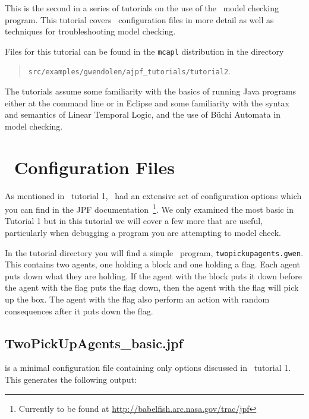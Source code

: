 
This is the second in a series of tutorials on the use of the \ajpf\ model checking program.  This tutorial covers \jpf\ configuration files in more detail as well as techniques for troubleshooting model checking.

Files for this tutorial can be found in the \texttt{mcapl} distribution in the directory 
\begin{quote}
\texttt{src/examples/gwendolen/ajpf\_tutorials/tutorial2}.
\end{quote}

The tutorials assume some familiarity with the basics of running Java programs either at the command line or in Eclipse and some familiarity with the syntax and semantics of Linear Temporal Logic, and the use of B\"{u}chi Automata in model checking.

\section{\jpf\ Configuration Files}
As mentioned in \ajpf\ tutorial 1, \jpf\ had an extensive set of configuration options which you can find in the JPF documentation~\footnote{Currently to be found at \url{http://babelfish.arc.nasa.gov/trac/jpf}}. We only examined the most basic in Tutorial 1 but in this tutorial we will cover a few more that are useful, particularly when debugging a program you are attempting to model check.

\begin{sloppypar}
In the tutorial directory you will find a simple \gwendolen\ program, \texttt{twopickupagents.gwen}.  This contains two agents, one holding a block and one holding a flag.  Each agent puts down what they are holding.  If the agent with the block puts it down before the agent with the flag puts the flag down, then the agent with the flag will pick up the box.  The agent with the flag also perform an action with random consequences after it puts down the flag.
\end{sloppypar}

\subsection{TwoPickUpAgents\_basic.jpf} is a minimal configuration file containing only options discussed in \ajpf\ tutorial 1.  This generates the following output:

